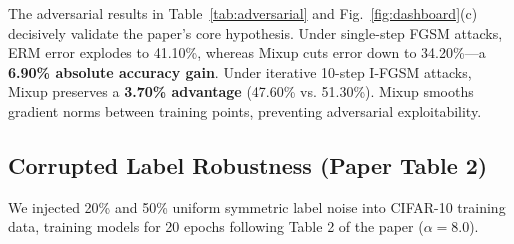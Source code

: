 \documentclass[conference]{IEEEtran}
\begin{document}
\begin{table}[htbp]
\caption{Adversarial Robustness Under White-Box Gradient Attacks}
\begin{center}
\label{tab:adversarial}
\end{center}
\end{table}

The adversarial results in Table~\ref{tab:adversarial} and Fig.~\ref{fig:dashboard}(c) decisively validate the paper's core hypothesis. Under single-step FGSM attacks, ERM error explodes to 41.10\%, whereas Mixup cuts error down to 34.20\%—a \textbf{6.90\% absolute accuracy gain}. Under iterative 10-step I-FGSM attacks, Mixup preserves a \textbf{3.70\% advantage} (47.60\% vs. 51.30\%). Mixup smooths gradient norms between training points, preventing adversarial exploitability.

\subsection{Corrupted Label Robustness (Paper Table 2)}
We injected 20\% and 50\% uniform symmetric label noise into CIFAR-10 training data, training models for 20 epochs following Table 2 of the paper ($\alpha=8.0$).

\begin{table}[htbp]
\caption{Corrupted Label Noise Robustness (20-Epoch Compute Budget)}
\begin{center}
\label{tab:label_noise}
\end{center}
\end{table}
\end{document}
